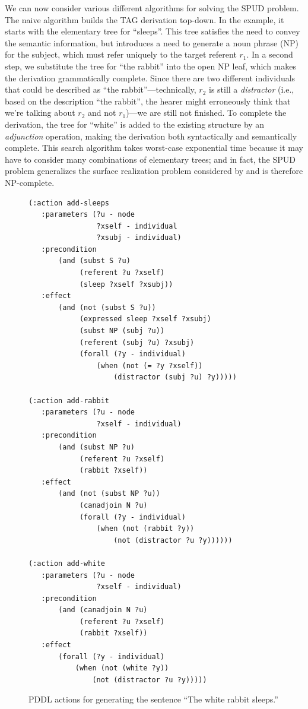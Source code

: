 \documentclass[letterpaper]{article}
\begin{document}
We can now consider various different algorithms for solving the SPUD
problem. The naive algorithm builds the TAG derivation top-down. In
the example, it starts with the elementary tree for ``sleeps''. This
tree satisfies the need to convey the semantic information, but
introduces a need to generate a noun phrase (NP) for the subject,
which must refer uniquely to the target referent $r_1$. In a second
step, we substitute the tree for ``the rabbit'' into the open NP leaf,
which makes the derivation grammatically complete. Since there are two
different individuals that could be described as ``the
rabbit''---technically, $r_2$ is still a \emph{distractor} (i.e.,
based on the description ``the rabbit'', the hearer might erroneously
think that we're talking about $r_2$ and not $r_1$)---we are still not
finished. To complete the derivation, the tree for ``white'' is added
to the existing structure by an \emph{adjunction} operation, making
the derivation both syntactically and semantically complete. This
search algorithm takes worst-case exponential time because it may have
to consider many combinations of elementary trees; and in fact, the
SPUD problem generalizes the surface realization problem considered by
\citet{KolStr02} and is therefore NP-complete.


\begin{figure}[p]
\centering
\begin{minipage}{0.5\textwidth}
{\small%
\begin{verbatim}
(:action add-sleeps
   :parameters (?u - node
                ?xself - individual
                ?xsubj - individual)
   :precondition
       (and (subst S ?u)
            (referent ?u ?xself)
            (sleep ?xself ?xsubj))
   :effect 
       (and (not (subst S ?u))
            (expressed sleep ?xself ?xsubj)
            (subst NP (subj ?u))
            (referent (subj ?u) ?xsubj)
            (forall (?y - individual)
                (when (not (= ?y ?xself))
                    (distractor (subj ?u) ?y)))))

(:action add-rabbit
   :parameters (?u - node
                ?xself - individual)
   :precondition 
       (and (subst NP ?u)
            (referent ?u ?xself)
            (rabbit ?xself))
   :effect 
       (and (not (subst NP ?u))
            (canadjoin N ?u)
            (forall (?y - individual)
                (when (not (rabbit ?y))
                    (not (distractor ?u ?y))))))

(:action add-white
   :parameters (?u - node
                ?xself - individual)
   :precondition 
       (and (canadjoin N ?u)
            (referent ?u ?xself)
            (rabbit ?xself))
   :effect 
       (forall (?y - individual)
           (when (not (white ?y))
               (not (distractor ?u ?y)))))
\end{verbatim}}%
\end{minipage}
\caption{PDDL actions for generating the sentence ``The white rabbit
sleeps.''}
\label{fig:white-rabbit-as-planning}
\end{figure}
\end{document}
